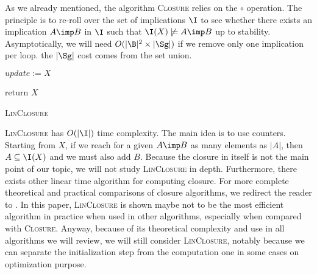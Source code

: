 As we already mentioned, the algorithm \textsc{Closure} relies on the $\circ$ 
operation. The principle is to re-roll over the set of implications $\I$ to see 
whether there exists an implication $A \imp B$ in $\I$ such that $\I(X) 
\not\models A \imp B$ up to stability. Asymptotically, we will need $O(|\B|^2 
\times |\Sg|)$ if we remove only one implication per loop. the $|\Sg|$ cost
comes from the set union.

\vspace{1.2em}

\begin{algorithm}

\BlankLine
\BlankLine


\BlankLine

$update := X$ \;

\BlankLine


return $X$ \;

\caption{\textsc{LinClosure}}
\label{alg:linclosure}
\end{algorithm}

\textsc{LinClosure} has $O(|\I|)$ time complexity. The main idea is to use
counters. Starting from $X$, if we reach for a given $A \imp B$ as many elements
as $|A|$, then $A \subseteq \I(X)$ and we must also add $B$. Because the closure
in itself is not the main point of our topic, we will not study 
\textsc{LinClosure} in depth. Furthermore, there exists other linear time 
algorithm for computing closure. For more complete theoretical and practical 
comparisons of closure algorithms, we redirect the reader to 
\cite{bazhanov_optimizations_2014}. In this paper, \textsc{LinClosure} is 
shown maybe not to be the most efficient algorithm in practice when used in 
other algorithms, especially when compared with \textsc{Closure}. Anyway, 
because of its theoretical complexity and use in all algorithms we will review, 
we will still consider \textsc{LinClosure}, notably because we can separate the 
initialization step from the computation one in some cases on optimization 
purpose.

